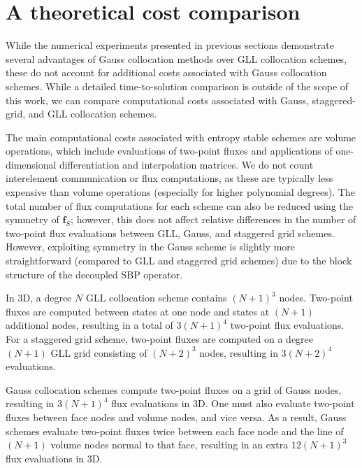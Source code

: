 \documentclass[review,onefignum,onetabnum,final]{siamart171218}
\begin{document}
\section{A theoretical cost comparison}

While the numerical experiments presented in previous sections demonstrate several advantages of Gauss collocation methods over GLL collocation schemes, these do not account for additional costs associated with Gauss collocation schemes.  While a detailed time-to-solution comparison is outside of the scope of this work, we can compare computational costs associated with Gauss, staggered-grid, and GLL collocation schemes.  

The main computational costs associated with entropy stable schemes are volume operations, which include evaluations of two-point fluxes and applications of one-dimensional differentiation and interpolation matrices.  We do not count interelement communication or flux computations, as these are typically less expensive than volume operations (especially for higher polynomial degrees).  The total number of flux computations for each scheme can also be reduced using the symmetry of $\bm{f}_S$; however, this does not affect relative differences in the number of two-point flux evaluations between GLL, Gauss, and staggered grid schemes.  However, exploiting symmetry in the Gauss scheme is slightly more straightforward (compared to GLL and staggered grid schemes) due to the block structure of the decoupled SBP operator.

In 3D, a degree $N$ GLL collocation scheme contains $(N+1)^3$ nodes.  Two-point fluxes are computed between states at one node and states at $(N+1)$ additional nodes, resulting in a total of $3(N+1)^4$ two-point flux evaluations.  For a staggered grid scheme, two-point fluxes are computed on a degree $(N+1)$ GLL grid consisting of $(N+2)^3$ nodes, resulting in $3(N+2)^4$ evaluations.  

Gauss collocation schemes compute two-point fluxes on a grid of Gauss nodes, resulting in $3(N+1)^4$ flux evaluations in 3D.  One must also evaluate two-point fluxes between face nodes and volume nodes, and vice versa.  As a result, Gauss schemes evaluate two-point fluxes twice between each face node and the line of $(N+1)$ volume nodes normal to that face, resulting in an extra $12(N+1)^3$ flux evaluations in 3D.  %
\end{document}
